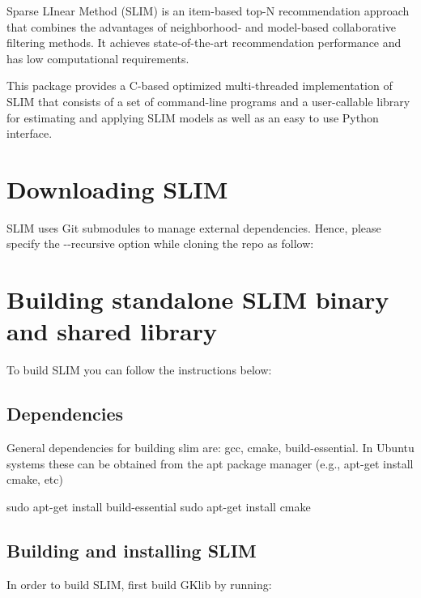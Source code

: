 Sparse L\+Inear Method (S\+L\+IM) \cite{ning2011slim} is an item-\/based top-\/N recommendation approach that combines the advantages of neighborhood-\/ and model-\/based collaborative filtering methods. It achieves state-\/of-\/the-\/art recommendation performance and has low computational requirements.

This package provides a C-\/based optimized multi-\/threaded implementation of S\+L\+IM that consists of a set of command-\/line programs and a user-\/callable library for estimating and applying S\+L\+IM models as well as an easy to use Python interface.

\subsection*{}\hypertarget{index_download}{}\section{Downloading S\+L\+IM}\label{index_download}
S\+L\+IM uses Git submodules to manage external dependencies. Hence, please specify the {\ttfamily -\/-\/recursive} option while cloning the repo as follow\+: 
\begin{DoxyCode}{0}
\end{DoxyCode}
\hypertarget{index_installation}{}\section{Building standalone S\+L\+I\+M binary and shared library}\label{index_installation}
To build S\+L\+IM you can follow the instructions below\+:\hypertarget{index_deps}{}\subsection{Dependencies}\label{index_deps}
General dependencies for building slim are\+: gcc, cmake, build-\/essential. In Ubuntu systems these can be obtained from the apt package manager (e.\+g., apt-\/get install cmake, etc)

\begin{DoxyVerb}sudo apt-get install build-essential
sudo apt-get install cmake
\end{DoxyVerb}
\hypertarget{index_without_mkl}{}\subsection{Building and installing S\+L\+IM}\label{index_without_mkl}
In order to build S\+L\+IM, first build G\+Klib by running\+:

